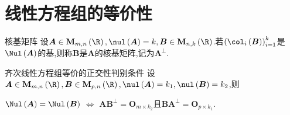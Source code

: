 \section{线性方程组的等价性}

\begin{definition}{核基矩阵}{}
	设$\boldsymbol{A}\in\mathbf{M}_{m,n}\left(\R\right),\nul\left(\boldsymbol{A}\right)=k,\boldsymbol{B}\in\mathbf{M}_{n,k}\left(\R\right)$.若$\left(\col_{i}\left(\boldsymbol{B}\right)\right)_{i=1}^{k}$是$\Nul\left(\boldsymbol{A}\right)$的基,则称$\boldsymbol{B}$是$\boldsymbol{A}$的核基矩阵,记为$\boldsymbol{A}^{\perp}$.
\end{definition}

\begin{theorem}{齐次线性方程组等价的正交性判别条件}{}
	设$\boldsymbol{A}\in\mathbf{M}_{m,n}\left(\R\right),\boldsymbol{B}\in\mathbf{M}_{p,n}\left(\R\right),\nul\left(\boldsymbol{A}\right)=k_{1},\nul\left(\boldsymbol{B}\right)=k_{2}$,则
	\begin{center}
		$\Nul\left(\boldsymbol{A}\right)=\Nul\left(\boldsymbol{B}\right)$ $\iff$ $\boldsymbol{A}\boldsymbol{B}^{\perp}=\boldsymbol{O}_{m\times k_{2}}$且$\boldsymbol{B}\boldsymbol{A}^{\perp}=\boldsymbol{O}_{p\times k_{1}}$.
	\end{center}
\end{theorem}



